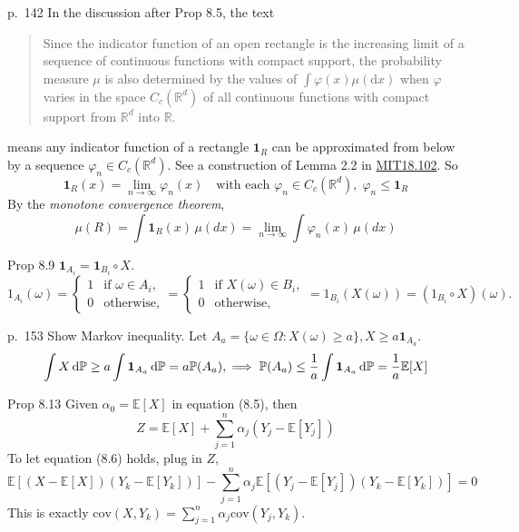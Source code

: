 \begin{note}{p.~142}
    In the discussion after Prop 8.5, the text
    \begin{quote}
        Since the indicator function of an open rectangle is the increasing limit of a sequence of continuous functions with compact support, the probability measure \( \mu \) is also determined by the values of \( \int \varphi(x) \mu(\mathrm{d} x) \) when \( \varphi \) varies in the space \( C_{c}\left(\mathbb{R}^{d}\right) \) of all continuous functions with compact support from \( \mathbb{R}^{d} \) into \( \mathbb{R} \). 
    \end{quote}
    means any indicator function of a rectangle $\mathbf{1}_R$ can be approximated from below by a sequence $\varphi_n\in C_c(\mathbb{R}^d)$. See a construction of Lemma 2.2 in \href{https://ocw.mit.edu/courses/18-102-introduction-to-functional-analysis-spring-2021/3d4cc88026d44a01f936cd6a0aa995cb_MIT18_102s20_lec_FA.pdf}{MIT18.102}. So
    \[
    \mathbf{1}_R(x) = \lim_{n \to \infty} \varphi_n(x) \quad \text{with each } \varphi_n \in C_c(\mathbb{R}^d), \; \varphi_n \leq \mathbf{1}_R
    \]
    By the \emph{monotone convergence theorem},
    $$
    \mu(R) = \int \mathbf{1}_R(x) \, \mu(dx) = \lim_{n \to \infty} \int \varphi_n(x) \, \mu(dx)
    $$
\end{note}

\begin{note}{Prop 8.9}
    $\mathbf{1}_{A_i}=\mathbf{1}_{B_i}\circ X$. 
    \[
1_{A_i}(\omega) = \begin{cases}
1 & \text{if } \omega \in A_i, \\
0 & \text{otherwise},
\end{cases}
= \begin{cases}
1 & \text{if } X(\omega) \in B_i, \\
0 & \text{otherwise},
\end{cases}
= 1_{B_i}(X(\omega)) = (1_{B_i} \circ X)(\omega).
\]
\end{note}

\begin{note}{p.~153}
    Show Markov inequality. Let $A_a=\{\omega\in\Omega: X(\omega)\ge a\}, X\ge a\mathbf{1}_{A_a}.$ 
    \[
    \int X\mathop{}\!\mathrm{d} \mathbb{P}\ge a\int\mathbf{1}_{A_a}\mathop{}\!\mathrm{d} \mathbb{P}=a\mathbb{P}(A_a),\implies \mathbb{P}(A_a)\le\frac{1}{a}\int\mathbf{1}_{A_a}\mathop{}\!\mathrm{d} \mathbb{P}=\frac{1}{a}\mathbb{E}[X]
    \]
\end{note}

\begin{note}{Prop 8.13}
    Given $\alpha_0=\mathbb{E}[X]$ in equation (8.5), then 
    \[
    Z=\mathbb{E}[X]+\sum_{j=1}^n \alpha_j (Y_j-\mathbb{E}[Y_j])
    \]
    To let equation (8.6) holds, plug in $Z$,
    \[
    \mathbb{E}[(X-\mathbb{E}[X])(Y_k-\mathbb{E}[Y_k])]-\sum_{j=1}^n \alpha_j \mathbb{E}[(Y_j-\mathbb{E}[Y_j])(Y_k-\mathbb{E}[Y_k])]=0
    \]
    This is exactly $\text{cov}(X,Y_k)=\sum_{j=1}^n \alpha_j\text{cov}(Y_j,Y_k)$.
\end{note}

